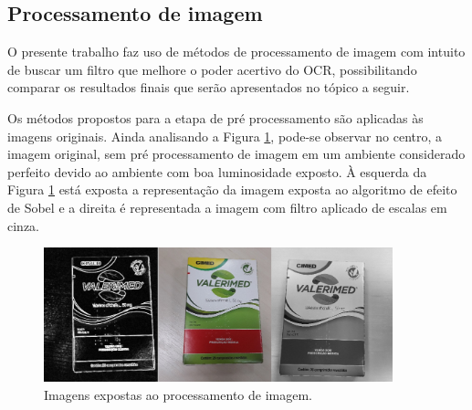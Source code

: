 \subsection{Processamento de imagem}
O presente trabalho faz uso de métodos de processamento de imagem com intuito de buscar um filtro que melhore o poder acertivo do OCR, possibilitando comparar os resultados finais que serão apresentados no tópico a seguir.

Os métodos propostos para a etapa de pré processamento são aplicadas às imagens originais. Ainda analisando a Figura \ref{tratamentoimg}, pode-se observar no centro, a imagem original, sem pré processamento de imagem em um ambiente considerado perfeito devido ao ambiente com boa luminosidade exposto. À esquerda da Figura \ref{tratamentoimg} está exposta a representação da imagem exposta ao algoritmo de efeito de Sobel e a direita é representada a imagem com filtro aplicado de escalas em cinza.

\begin{figure}[h!]
	\centering
	\includegraphics[width=0.90\textwidth]{Imagens/tratamentoimg.jpg} 
	\caption[Imagens expostas ao processamento de imagem.]{Imagens expostas ao processamento de imagem.}
	\label{tratamentoimg}
\end{figure}